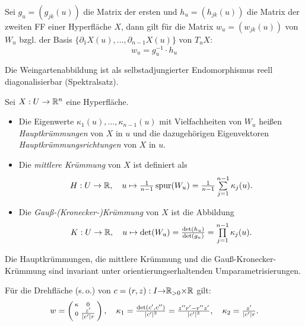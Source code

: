 \documentclass{cheat-sheet}
\begin{document}

\begin{satz}
  Sei $g_u = (g_{jk}(u))$ die Matrix der ersten und $h_u = (h_{jk}(u))$ die Matrix der zweiten FF einer Hyperfläche $X$, dann gilt für die Matrix $w_u = (w_{jk}(u))$ von $W_u$ bzgl. der Basis $\{ \partial_1 X(u), ..., \partial_{n-1} X(u) \}$ von $T_u X$:
  \[ w_u = g_u^{-1} \cdot h_u \]
\end{satz}

\begin{bem}
  Die Weingartenabbildung ist als selbstadjungierter Endomorphismus reell diagonalisierbar (Spektralsatz).
\end{bem}

\begin{defn}
  Sei $X : U \to \mathbb{R}^n$ eine Hyperfläche.
  \begin{itemize}
    \item Die Eigenwerte $\kappa_1(u), ..., \kappa_{n-1}(u)$ mit Vielfachheiten von $W_u$ heißen \emph{Hauptkrümmungen} von $X$ in $u$ und die dazugehörigen Eigenvektoren \emph{Hauptkrümmungsrichtungen} von $X$ in $u$.
    \item Die \emph{mittlere Krümmung} von $X$ ist definiert als
    \[ H : U \to \R, \quad u \mapsto \tfrac{1}{n-1} \, \spur(W_u) = \tfrac{1}{n-1} \sum_{j=1}^{n-1} \kappa_j(u). \]
    \item Die \emph{Gauß-(Kronecker-)Krümmung} von $X$ ist die Abbildung
    \[ K : U \to \R, \quad u \mapsto \det(W_u) = \tfrac{\det(h_u)}{\det(g_u)} = \prod_{j=1}^{n-1} \kappa_j(u). \]
  \end{itemize}
\end{defn}

\begin{satz}
  Die Hauptkrümmungen, die mittlere Krümmung und die Gauß-Kronecker-Krümmung sind invariant unter orientierungserhaltenden Umparametrisierungen.
\end{satz}

\begin{bsp}
  Für die Drehfläche (s.\,o.) von $c = (r, z) : I {\to} \mathbb{R}_{>0} {\times} \mathbb{R}$ gilt:
  \[
    w = \left( \begin{smallmatrix} \kappa & 0 \\ 0 & \tfrac{z'}{\lvert c'\rvert r} \end{smallmatrix} \right), \quad
    \kappa_1 = \tfrac{\det(c', c'')}{\lvert c'\rvert^3} = \tfrac{z'' r' - r'' z'}{\lvert c'\rvert^3}, \quad
    \kappa_2 = \tfrac{z'}{\lvert c'\rvert r}.
  \]
\end{bsp}
\end{document}
